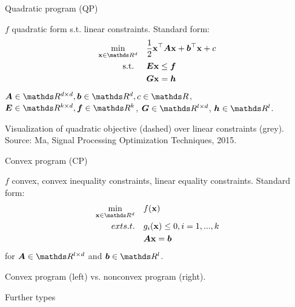 \documentclass[11pt,compress,t,notes=noshow, xcolor=table]{beamer}
\begin{document}
\begin{framei}{Quadratic program (QP)}
\item $f$ quadratic form s.t. linear constraints. Standard form:
$$
\begin{aligned}
\min_{\xv \in \R^d} \quad & \frac{1}{2} \xv^\top \bm{A} \xv + \bm{b}^\top \xv + c \\
\text{s.t. } \quad & \bm{E}\xv \le \bm{f} \\
& \bm{G}\xv = \bm{h}
\end{aligned}
$$
$\bm{A} \in \R^{d \times d}, \bm{b} \in \R^d, c \in \R$, $\bm{E} \in \R^{k \times d}, \bm{f} \in \R^k$, $\bm{G} \in \R^{l \times d}$, $\bm{h} \in \R^l$.
\vfill
{}
\begin{footnotesize}
Visualization of quadratic objective (dashed) over linear constraints (grey). Source: Ma, Signal Processing Optimization Techniques, 2015. %
\end{footnotesize}
\end{framei}


\begin{framei}{Convex program (CP)}
\item $f$ convex, convex inequality constraints, linear equality constraints. Standard form:
$$
\begin{aligned}
\min_{\xv \in \R^d} \quad & \fx \\
ext{s.t. } \quad & g_i(\xv) \le 0, i = 1, ..., k \\
& \bm{A}\xv = \bm{b}
\end{aligned}
$$
for $\bm{A} \in \R^{l \times d}$ and $\bm{b} \in \R^l$.
\vfill
{}
\begin{center}\begin{footnotesize}
Convex program (left) vs. nonconvex program (right).
\end{footnotesize}\end{center}
\end{framei}


\begin{frame2}{Further types}
\end{frame2}
\end{document}
